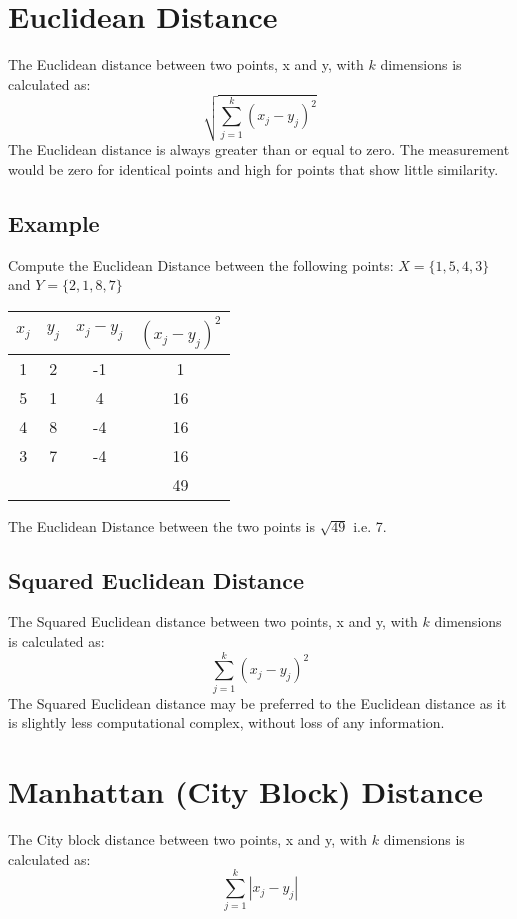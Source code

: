 \section{Euclidean Distance}
The Euclidean distance between two points, x and y, with $k$ dimensions is calculated as:
\[ \sqrt{ \sum^{k}_{j=1} ( x_j - y_j)^2 } \]
The Euclidean distance is always greater than or equal to zero. The measurement would be zero for identical points and high for points that show little similarity.
\subsection{Example}
Compute the Euclidean Distance between the following points:
$X = \{1,5,4,3\}$ and $Y = \{2,1,8,7\}$

\begin{center}
\begin{tabular}{|c|c|c|c|}
  \hline
$x_j$	&	$y_j$	&   $x_j - y_j$	&	$(x_j - y_j)^2$	\\ \hline
1	&	2	&	-1	&	1	\\
5	&	1	&	4	&	16	\\
4	&	8	&	-4	&	16	\\
3	&	7	&	-4	&	16	\\ \hline
	&		&		&	49	\\ \hline
\end{tabular}
\end{center}
The Euclidean Distance between the two points is $\sqrt{49}$ i.e. 7.
\subsection{Squared Euclidean Distance}
The Squared Euclidean distance between two points, x and y, with $k$ dimensions is calculated as:
\[ \sum^{k}_{j=1} ( x_j - y_j)^2  \]
The Squared Euclidean distance may be preferred to the Euclidean distance as it is slightly less computational complex, without loss of any information.
\newpage
\section{Manhattan (City Block) Distance}
The City block distance between two points, x and y, with $k$ dimensions is calculated as:
\[ \sum^{k}_{j=1} | x_j - y_j |  \]

